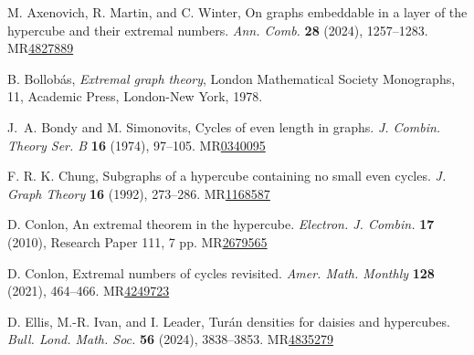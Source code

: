 \documentclass[A4paper,reqno,oneside,11pt]{amsart}
\theoremstyle{plain}
\theoremstyle{definition}
\begin{document}

\begin{thebibliography}{}


M. Axenovich, R. Martin, and C. Winter, On graphs embeddable in a layer of the hypercube and their extremal numbers.
{\it Ann. Comb.} {\bf 28} (2024), 1257--1283.
MR\href{https://mathscinet.ams.org/mathscinet/article?mr=4827889}{4827889}

B. Bollob\'as, 
{\it Extremal graph theory}, 
London Mathematical Society Monographs, 11, Academic Press, London-New York, 1978.

J.~A. Bondy and M. Simonovits, Cycles of even length in graphs.
{\it J. Combin. Theory Ser. B} {\bf 16} (1974), 97--105.
MR\href{https://mathscinet.ams.org/mathscinet/article?mr=340095}{0340095}

F. R. K. Chung, Subgraphs of a hypercube containing no small even cycles.
{\it J. Graph Theory} {\bf 16} (1992), 273--286. MR\href{https://mathscinet.ams.org/mathscinet/article?mr=1168587}{1168587}

D. Conlon, An extremal theorem in the hypercube.
{\it Electron. J. Combin.} {\bf 17} (2010), Research Paper 111, 7 pp.
MR\href{https://mathscinet.ams.org/mathscinet/article?mr=2679565}{2679565}

D. Conlon, Extremal numbers of cycles revisited.
{\it Amer. Math. Monthly} {\bf 128} (2021), 464--466.
MR\href{https://mathscinet.ams.org/mathscinet/article?mr=4249723}{4249723}

D. Ellis, M.-R. Ivan, and I. Leader, Tur\'an densities for daisies and hypercubes.
{\it Bull. Lond. Math. Soc.} {\bf 56} (2024), 3838--3853. MR\href{https://mathscinet.ams.org/mathscinet/article?mr=4835279}{4835279}



\end{thebibliography}
\end{document}

